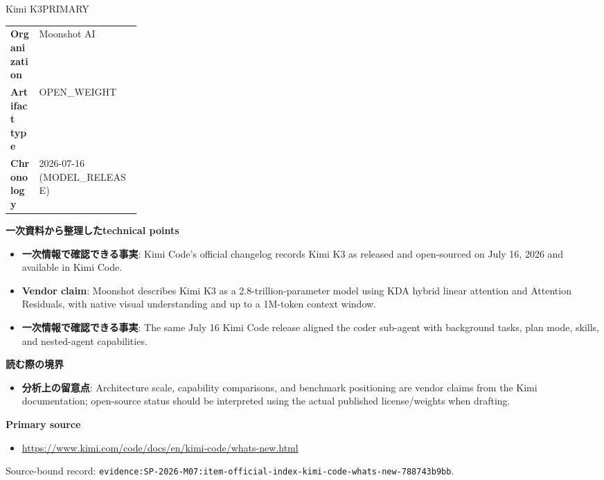 \begin{technicalnote}{Kimi K3}{PRIMARY}
\begin{tabularx}{\linewidth}{@{}>{\bfseries}p{0.22\linewidth}X@{}}
Organization & Moonshot AI \\
Artifact type & OPEN\_WEIGHT \\
Chronology & 2026-07-16 (MODEL\_RELEASE) \\
\end{tabularx}
\smallskip
{\bfseries 一次資料から整理したtechnical points}
\begin{itemize}[leftmargin=1.5em,itemsep=0.35em]
\item \textbf{一次情報で確認できる事実}: Kimi Code's official changelog records Kimi K3 as released and open-sourced on July 16, 2026 and available in Kimi Code.
\item \textbf{Vendor claim}: Moonshot describes Kimi K3 as a 2.8-trillion-parameter model using KDA hybrid linear attention and Attention Residuals, with native visual understanding and up to a 1M-token context window.
\item \textbf{一次情報で確認できる事実}: The same July 16 Kimi Code release aligned the coder sub-agent with background tasks, plan mode, skills, and nested-agent capabilities.
\end{itemize}
{\bfseries 読む際の境界}
\begin{itemize}[leftmargin=1.5em,itemsep=0.35em]
\item \textbf{分析上の留意点}: Architecture scale, capability comparisons, and benchmark positioning are vendor claims from the Kimi documentation; open-source status should be interpreted using the actual published license/weights when drafting.
\end{itemize}
{\bfseries Primary source}
\begin{itemize}[leftmargin=1.5em,itemsep=0.25em]
\item \url{https://www.kimi.com/code/docs/en/kimi-code/whats-new.html}
\end{itemize}
{\scriptsize\color{SurveyMuted}Source-bound record: \texttt{evidence:SP-2026-M07:item-official-index-kimi-code-whats-new-788743b9bb}.}
\end{technicalnote}
\medskip
